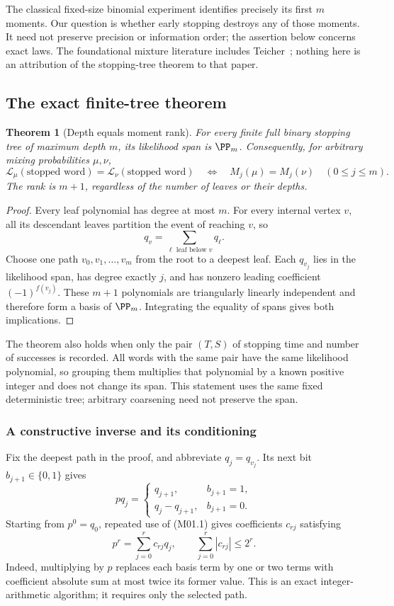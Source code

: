 \documentclass[11pt,a4paper]{article}
\newtheorem{theorem}{Theorem}[section]
\theoremstyle{definition}\newtheorem{definition}[theorem]{Definition}
\theoremstyle{remark}\newtheorem{remark}[theorem]{Remark}
\numberwithin{equation}{section}
\begin{document}
The classical fixed-size binomial experiment identifies precisely its first $m$ moments. Our question is whether early stopping destroys any of those moments. It need not preserve precision or information order; the assertion below concerns exact laws. The foundational mixture literature includes Teicher~\cite{ref012}; nothing here is an attribution of the stopping-tree theorem to that paper.

\subsection{The exact finite-tree theorem}\label{M01-sec-2}
\begin{theorem}[Depth equals moment rank]\label{M01-th:rank}
For every finite full binary stopping tree of maximum depth $m$, its likelihood span is $\PP_m$. Consequently, for arbitrary mixing probabilities $\mu,\nu$,
\[
 \mathcal L_\mu(\text{stopped word})=\mathcal L_\nu(\text{stopped word})
 \quad\Longleftrightarrow\quad
 M_j(\mu)=M_j(\nu)\quad(0\le j\le m).
\]
The rank is $m+1$, regardless of the number of leaves or their depths.
\end{theorem}
\begin{proof}
Every leaf polynomial has degree at most $m$. For every internal vertex $v$, all its descendant leaves partition the event of reaching $v$, so
\[
 q_v=\sum_{\ell\text{ leaf below }v}q_\ell.
\]
Choose one path $v_0,v_1,\ldots,v_m$ from the root to a deepest leaf. Each $q_{v_j}$ lies in the likelihood span, has degree exactly $j$, and has nonzero leading coefficient $(-1)^{f(v_j)}$. These $m+1$ polynomials are triangularly linearly independent and therefore form a basis of $\PP_m$. Integrating the equality of spans gives both implications.
\end{proof}

The theorem also holds when only the pair $(T,S)$ of stopping time and number of successes is recorded. All words with the same pair have the same likelihood polynomial, so grouping them multiplies that polynomial by a known positive integer and does not change its span. This statement uses the same fixed deterministic tree; arbitrary coarsening need not preserve the span.

\subsubsection{A constructive inverse and its conditioning}
Fix the deepest path in the proof, and abbreviate $q_j=q_{v_j}$. Its next bit $b_{j+1}\in\{0,1\}$ gives
\[
 p q_j=\begin{cases}q_{j+1},&b_{j+1}=1,\\q_j-q_{j+1},&b_{j+1}=0.\end{cases}\tag{M01.1}
\]
Starting from $p^0=q_0$, repeated use of (M01.1) gives coefficients $c_{rj}$ satisfying
\[
 p^r=\sum_{j=0}^r c_{rj}q_j,\qquad
 \sum_{j=0}^r|c_{rj}|\le 2^r.\tag{M01.2}
\]
Indeed, multiplying by $p$ replaces each basis term by one or two terms with coefficient absolute sum at most twice its former value. This is an exact integer-arithmetic algorithm; it requires only the selected path.
\end{document}
